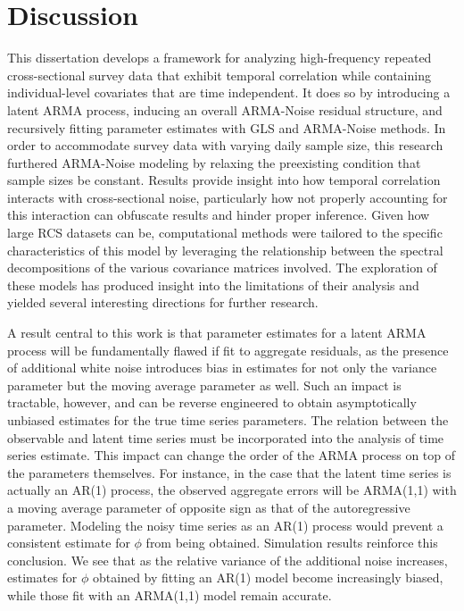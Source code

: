 \section{Discussion}
This dissertation develops a framework for analyzing high-frequency repeated cross-sectional survey data that exhibit temporal correlation while containing individual-level covariates that are time independent. It does so by introducing a latent ARMA process, inducing an overall ARMA-Noise residual structure, and recursively fitting parameter estimates with GLS and ARMA-Noise methods. In order to accommodate survey data with varying daily sample size, this research furthered ARMA-Noise modeling by relaxing the preexisting condition that sample sizes be constant. Results provide insight into how temporal correlation interacts with cross-sectional noise, particularly how not properly accounting for this interaction can obfuscate results and hinder proper inference. Given how large RCS datasets can be, computational methods were tailored to the specific characteristics of this model by leveraging the relationship between the spectral decompositions of the various covariance matrices involved. The exploration of these models has produced insight into the limitations of their analysis and yielded several interesting directions for further research.

A result central to this work is that parameter estimates for a latent ARMA process will be fundamentally flawed if fit to aggregate residuals, as the presence of additional white noise introduces bias in estimates for not only the variance parameter but the moving average parameter as well. Such an impact is tractable, however, and can be reverse engineered to obtain asymptotically unbiased estimates for the true time series parameters. The relation between the observable and latent time series must be incorporated into the analysis of time series estimate. This impact can change the order of the ARMA process on top of the parameters themselves. For instance, in the case that the latent time series is actually an AR(1) process, the observed aggregate errors will be ARMA(1,1) with a moving average parameter of opposite sign as that of the autoregressive parameter. Modeling the noisy time series as an AR(1) process would prevent a consistent estimate for $\phi$ from being obtained. Simulation results reinforce this conclusion. We see that as the relative variance of the additional noise increases, estimates for $\phi$ obtained by fitting an AR(1) model become increasingly biased, while those fit with an ARMA(1,1) model remain accurate.


